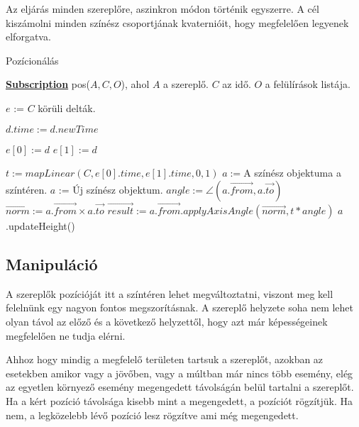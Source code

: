 Az eljárás minden szereplőre, aszinkron módon történik egyszerre. A cél kiszámolni minden színész csoportjának kvaternióit\cite{Quaternion}, hogy megfelelően legyenek elforgatva.

\begin{algorithm}[H]
	\caption{Pozícionálás}
	\label{alg:ibb}
	\textbf{\underline{Subscription}} pos($A, C, O$), ahol $A$ a szereplő. $C$ az idő. $O$ a felülírások listája.
	\begin{algorithmic}[1] %
	\STATE $e$ := $C$ körüli delták.

					\STATE $d.time := d.newTime$
				\ENDIF
			\ENDFOR

				\STATE $e[0] := d$
			\ENDIF
				\STATE $e[1] := d$
			\ENDIF

		\ENDFOR
	\ENDIF

	\STATE $t := mapLinear(C, e[0].time, e[1].time, 0, 1)$
	\STATE $a := $A színész objektuma a színtéren.  
		\STATE $a$ := Új színész objektum. 
	\ENDIF
	\STATE $angle := \angle(a.\overrightarrow{from}, a.\overrightarrow{to})$ 
	\STATE $\overrightarrow{norm} := a.\overrightarrow{from} × a.\overrightarrow{to}$ 
	\STATE $\overrightarrow{result} := a.\overrightarrow{from}.applyAxisAngle(\overrightarrow{norm}, t * angle) $
	\STATE $a$.updateHeight() 
	\end{algorithmic}
\end{algorithm}


\subsection{Manipuláció}

A szereplők pozícióját itt a színtéren lehet megváltoztatni, viszont meg kell felelnünk egy nagyon fontos megszorításnak. A szereplő helyzete soha nem lehet olyan távol az előző és a következő helyzettől, hogy azt már képességeinek megfelelően ne tudja elérni.

Ahhoz hogy mindig a megfelelő területen tartsuk a szereplőt, azokban az esetekben amikor vagy a jövőben, vagy a múltban már nincs több esemény, elég az egyetlen környező esemény megengedett távolságán belül tartalni a szereplőt. Ha a kért pozíció távolsága kisebb mint a megengedett, a pozíciót rögzítjük. Ha nem, a legközelebb lévő pozíció lesz rögzítve ami még megengedett.

